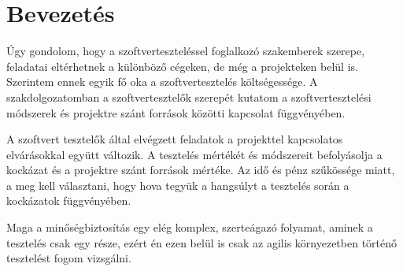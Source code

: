 \section{Bevezetés}
Úgy gondolom, hogy a szoftverteszteléssel foglalkozó szakemberek szerepe, feladatai eltérhetnek a különböző cégeken, de még a projekteken belül is.
Szerintem ennek egyik fő oka a szoftvertesztelés költségessége. A szakdolgozatomban a szoftvertesztelők szerepét kutatom a szoftvertesztelési módszerek és projektre szánt források közötti kapcsolat függvényében.

A szoftvert tesztelők által elvégzett feladatok a projekttel kapcsolatos elvárásokkal együtt változik.
A tesztelés mértékét és módszereit befolyásolja a kockázat és a projektre szánt források mértéke. Az idő és pénz szűkössége miatt, a meg kell választani, hogy hova tegyük a hangsúlyt a tesztelés során a kockázatok függvényében. \cite{istqbfoundations}

Maga a minőségbiztosítás egy elég komplex, szerteágazó folyamat, aminek a tesztelés csak egy része\cite{softwarequalityassurance2016}, ezért én ezen belül is csak az agilis környezetben történő tesztelést fogom vizsgálni.